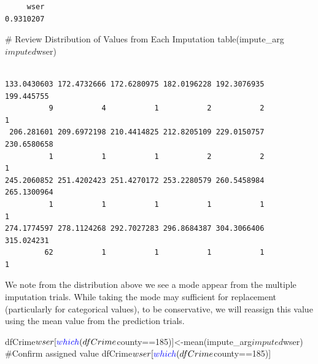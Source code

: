 \documentclass[]{article}
\newenvironment{Shaded}{}{}
\newcommand{\CommentTok}[1]{\textcolor[rgb]{0.00,0.50,0.00}{#1}}
\newcommand{\DecValTok}[1]{#1}
\newcommand{\KeywordTok}[1]{\textcolor[rgb]{0.00,0.00,1.00}{#1}}
\newcommand{\NormalTok}[1]{#1}
\newcommand{\OperatorTok}[1]{#1}
\begin{document}
\begin{Shaded}
\end{Shaded}

\begin{verbatim}
     wser 
0.9310207 
\end{verbatim}

\begin{Shaded}
\begin{Highlighting}[]
\CommentTok{# Review Distribution of Values from Each Imputation}
\KeywordTok{table}\NormalTok{(impute_arg}\OperatorTok{$}\NormalTok{imputed}\OperatorTok{$}\NormalTok{wser)}
\end{Highlighting}
\end{Shaded}

\begin{verbatim}

133.0430603 172.4732666 172.6280975 182.0196228 192.3076935  199.445755 
          9           4           1           2           2           1 
 206.281601 209.6972198 210.4414825 212.8205109 229.0150757 230.6580658 
          1           1           1           2           2           1 
245.2060852 251.4202423 251.4270172 253.2280579 260.5458984 265.1300964 
          1           1           1           1           1           1 
274.1774597 278.1124268 292.7027283 296.8684387 304.3066406  315.024231 
         62           1           1           1           1           1 
\end{verbatim}

We note from the distribution above we see a mode appear from the
multiple imputation trials. While taking the mode may sufficient for
replacement (particularly for categorical values), to be conservative,
we will reassign this value using the mean value from the prediction
trials.

\begin{Shaded}
\begin{Highlighting}[]
\NormalTok{dfCrime}\OperatorTok{$}\NormalTok{wser[}\KeywordTok{which}\NormalTok{(dfCrime}\OperatorTok{$}\NormalTok{county}\OperatorTok{==}\DecValTok{185}\NormalTok{)]<-}\KeywordTok{mean}\NormalTok{(impute_arg}\OperatorTok{$}\NormalTok{imputed}\OperatorTok{$}\NormalTok{wser)}
\CommentTok{#Confirm assigned value}
\NormalTok{dfCrime}\OperatorTok{$}\NormalTok{wser[}\KeywordTok{which}\NormalTok{(dfCrime}\OperatorTok{$}\NormalTok{county}\OperatorTok{==}\DecValTok{185}\NormalTok{)]}
\end{Highlighting}
\end{Shaded}
\end{document}
